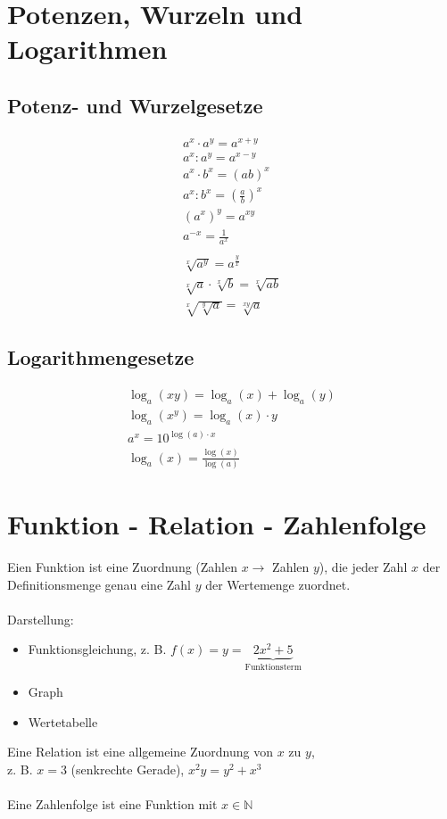 \section{Potenzen, Wurzeln und Logarithmen}

\subsection{Potenz- und Wurzelgesetze}
\begin{gather*}
  a^x \cdot a^y = a^{x + y} \\
  a^x : a^y = a^{x - y} \\
  a^x \cdot b^x = (ab)^x \\
  a^x : b^x = (\frac{a}{b})^x \\
  (a^x)^y = a^{xy} \\
  a^{-x} = \frac{1}{a^x} \\\\
  \sqrt[x]{a^y} = a^\frac{y}{x} \\
  \sqrt[x]{a} \cdot \sqrt[x]{b} = \sqrt[x]{ab} \\
  \sqrt[x]{\sqrt[y]{a}} = \sqrt[xy]{a}
\end{gather*}  

\subsection{Logarithmengesetze}
\begin{gather*}
  \log_a(xy) = \log_a(x) + \log_a(y) \\
  \log_a(x^y) = \log_a(x) \cdot y \\
  a^x = 10^{\log(a) \cdot x} \\
  \log_a(x) = \frac{\log(x)}{\log(a)}
\end{gather*}

\section{Funktion - Relation - Zahlenfolge}
Eien Funktion ist eine Zuordnung (Zahlen $x \rightarrow$ Zahlen $y$), die jeder Zahl $x$ der Definitionsmenge genau eine Zahl $y$ der Wertemenge zuordnet. \\\\
Darstellung:
\begin{itemize}
  \item Funktionsgleichung, z. B. $f(x) = y = \underbrace{2x^2 + 5}_\text{Funktionsterm}$
  \item Graph
  \item Wertetabelle
\end{itemize}
Eine Relation ist eine allgemeine Zuordnung von $x$ zu $y$,\\
z. B. $x = 3$ (senkrechte Gerade), $x^2y = y^2 + x^3$ \\\\
Eine Zahlenfolge ist eine Funktion mit $x \in \mathbb{N}$

